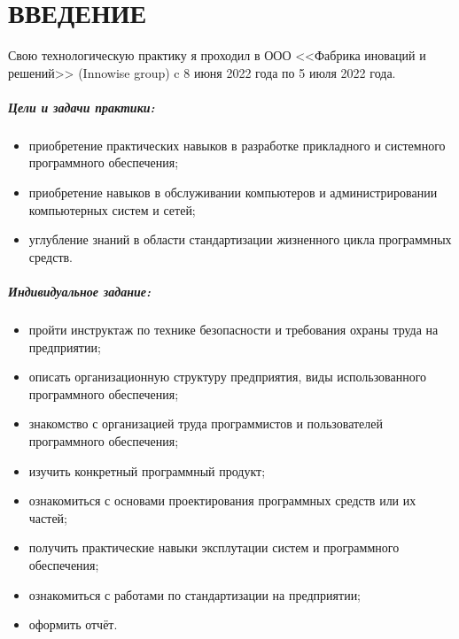 \newpage
\section*{ВВЕДЕНИЕ}
{}

Свою технологическую практику я проходил в ООО <<Фабрика иноваций и решений>>
(Innowise group) c 8 июня 2022 года по 5 июля 2022 года.

\subparagraph{Цели и задачи практики:} \hspace{0pt}

\begin{itemize}
  \item приобретение практических навыков в разработке прикладного и системного программного обеспечения;
  \item приобретение навыков в обслуживании компьютеров и администрировании компьютерных систем и сетей;
  \item углубление знаний в области стандартизации жизненного цикла программных средств.
\end{itemize}

\subparagraph{Индивидуальное задание:} \hspace{0pt}

\begin{itemize}
  \item пройти инструктаж по технике безопасности и требования охраны труда на предприятии;
  \item описать организационную структуру предприятия, виды использованного программного обеспечения;
  \item знакомство с организацией труда программистов и пользователей программного обеспечения;
  \item изучить конкретный программный продукт;
  \item ознакомиться с основами проектирования программных средств или их частей;
  \item получить практические навыки эксплутации систем и программного обеспечения;
  \item ознакомиться с работами по стандартизации на предприятии;
  \item оформить отчёт.
\end{itemize}
